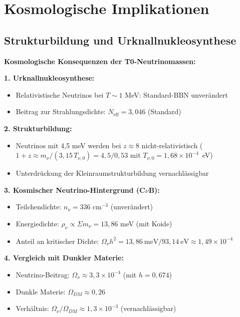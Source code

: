 	\section{Kosmologische Implikationen}
	
	\subsection{Strukturbildung und Urknallnukleosynthese}
	
	\begin{keyresult}
		\textbf{Kosmologische Konsequenzen der T0-Neutrinomassen:}
		
		\textbf{1. Urknallnukleosynthese:}
		\begin{itemize}
			\item Relativistische Neutrinos bei $T \sim 1$ MeV: Standard-BBN unverändert
			\item Beitrag zur Strahlungsdichte: $N_{\text{eff}} = 3,046$ (Standard)
		\end{itemize}
		
		\textbf{2. Strukturbildung:}
		\begin{itemize}
			\item Neutrinos mit 4,5 meV werden bei $z \approx 8$ nicht-relativistisch ($1+z \approx m_\nu/(3{,}15\,T_{\nu,0}) = 4{,}5/0{,}53$ mit $T_{\nu,0} = 1{,}68 \times 10^{-4}$~eV)
			\item Unterdrückung der Kleinraumstrukturbildung vernachlässigbar
		\end{itemize}
		
		\textbf{3. Kosmischer Neutrino-Hintergrund (C$\nu$B):}
		\begin{itemize}
			\item Teilchendichte: $n_\nu = 336$ cm$^{-3}$ (unverändert)
			\item Energiedichte: $\rho_\nu \propto \Sigma m_\nu = 13,86$ meV (mit Koide)
			\item Anteil an kritischer Dichte: $\Omega_\nu h^2 = 13{,}86\ \text{meV}/93{,}14\ \text{eV} \approx 1,49 \times 10^{-4}$
		\end{itemize}
		
		\textbf{4. Vergleich mit Dunkler Materie:}
		\begin{itemize}
			\item Neutrino-Beitrag: $\Omega_\nu \approx 3,3 \times 10^{-4}$ (mit $h = 0{,}674$)
			\item Dunkle Materie: $\Omega_{DM} \approx 0,26$
			\item Verhältnis: $\Omega_\nu/\Omega_{DM} \approx 1,3 \times 10^{-3}$ (vernachlässigbar)
		\end{itemize}
	\end{keyresult}
	
